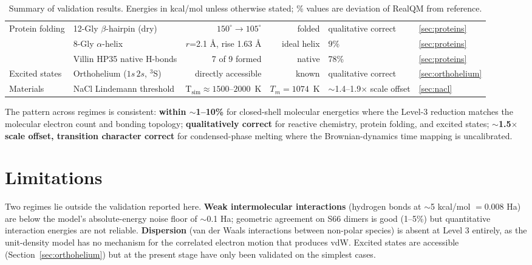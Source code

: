 \documentclass[11pt]{article}
\begin{document}
\begin{table}[h!]
\begin{tabular}{l l r r l l}
\midrule
Protein folding        & 12-Gly $\beta$-hairpin (dry)     & $150^\circ \to 105^\circ$ & folded   & qualitative correct  & \ref{sec:proteins}  \\
                       & 8-Gly $\alpha$-helix             & $r$=2.1 \AA, rise 1.63 \AA & ideal helix & 9\%             & \ref{sec:proteins}  \\
                       & Villin HP35 native H-bonds       & 7 of 9 formed         & native       & 78\%                  & \ref{sec:proteins}  \\
\midrule
Excited states         & Orthohelium ($1s\,2s$, $^3$S)    & directly accessible  & known         & qualitative correct & \ref{sec:orthohelium}\\
\midrule
Materials              & NaCl Lindemann threshold       & T$_\mathrm{sim} \approx 1500$--$2000$~K & $T_m = 1074$~K & $\sim$1.4--1.9$\times$ scale offset & \ref{sec:nacl}     \\
\bottomrule
\end{tabular}
\caption{Summary of validation results. Energies in kcal/mol unless otherwise stated; \% values are deviation of RealQM from reference.}
\label{tab:summary}
\end{table}

The pattern across regimes is consistent: \textbf{within $\sim$1--10\%} for closed-shell molecular energetics where the Level-3 reduction matches the molecular electron count and bonding topology; \textbf{qualitatively correct} for reactive chemistry, protein folding, and excited states; \textbf{$\sim$1.5$\times$ scale offset, transition character correct} for condensed-phase melting where the Brownian-dynamics time mapping is uncalibrated.

\section{Limitations}\label{sec:limitations}

Two regimes lie outside the validation reported here. \textbf{Weak intermolecular interactions} (hydrogen bonds at $\sim$5 kcal/mol $= 0.008$ Ha) are below the model's absolute-energy noise floor of $\sim$0.1 Ha; geometric agreement on S66 dimers is good (1--5\%) but quantitative interaction energies are not reliable. \textbf{Dispersion} (van der Waals interactions between non-polar species) is absent at Level 3 entirely, as the unit-density model has no mechanism for the correlated electron motion that produces vdW. Excited states are accessible (Section~\ref{sec:orthohelium}) but at the present stage have only been validated on the simplest cases.
\end{document}
